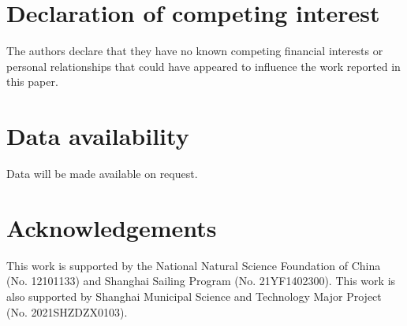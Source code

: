 \documentclass[review]{elsarticle}
\begin{document}
\section*{Declaration of competing interest}

The authors declare that they have no known competing financial interests or personal relationships that could have appeared to influence the work reported in this paper.

\section*{Data availability}

Data will be made available on request.

\section*{Acknowledgements}

This work is supported by the National Natural Science Foundation of China (No. 12101133) and Shanghai Sailing Program (No. 21YF1402300). This work is also supported by Shanghai Municipal Science and Technology Major Project (No. 2021SHZDZX0103).


\end{document}
